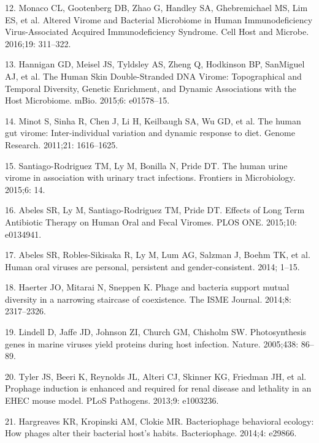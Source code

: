\documentclass[12pt,]{article}
\begin{document}
\hypertarget{ref-Monaco:2016ita}{}
12. Monaco CL, Gootenberg DB, Zhao G, Handley SA, Ghebremichael MS, Lim
ES, et al. Altered Virome and Bacterial Microbiome in Human
Immunodeficiency Virus-Associated Acquired Immunodeficiency Syndrome.
Cell Host and Microbe. 2016;19: 311--322.

\hypertarget{ref-Hannigan:2015fz}{}
13. Hannigan GD, Meisel JS, Tyldsley AS, Zheng Q, Hodkinson BP,
SanMiguel AJ, et al. The Human Skin Double-Stranded DNA Virome:
Topographical and Temporal Diversity, Genetic Enrichment, and Dynamic
Associations with the Host Microbiome. mBio. 2015;6: e01578--15.

\hypertarget{ref-Minot:2011ez}{}
14. Minot S, Sinha R, Chen J, Li H, Keilbaugh SA, Wu GD, et al. The
human gut virome: Inter-individual variation and dynamic response to
diet. Genome Research. 2011;21: 1616--1625.

\hypertarget{ref-SantiagoRodriguez:2015gd}{}
15. Santiago-Rodriguez TM, Ly M, Bonilla N, Pride DT. The human urine
virome in association with urinary tract infections. Frontiers in
Microbiology. 2015;6: 14.

\hypertarget{ref-Abeles:2015dy}{}
16. Abeles SR, Ly M, Santiago-Rodriguez TM, Pride DT. Effects of Long
Term Antibiotic Therapy on Human Oral and Fecal Viromes. PLOS ONE.
2015;10: e0134941.

\hypertarget{ref-Abeles:2014kj}{}
17. Abeles SR, Robles-Sikisaka R, Ly M, Lum AG, Salzman J, Boehm TK, et
al. Human oral viruses are personal, persistent and gender-consistent.
2014; 1--15.

\hypertarget{ref-Haerter:2014ii}{}
18. Haerter JO, Mitarai N, Sneppen K. Phage and bacteria support mutual
diversity in a narrowing staircase of coexistence. The ISME Journal.
2014;8: 2317--2326.

\hypertarget{ref-Lindell:2005gz}{}
19. Lindell D, Jaffe JD, Johnson ZI, Church GM, Chisholm SW.
Photosynthesis genes in marine viruses yield proteins during host
infection. Nature. 2005;438: 86--89.

\hypertarget{ref-Tyler:2013fl}{}
20. Tyler JS, Beeri K, Reynolds JL, Alteri CJ, Skinner KG, Friedman JH,
et al. Prophage induction is enhanced and required for renal disease and
lethality in an EHEC mouse model. PLoS Pathogens. 2013;9: e1003236.

\hypertarget{ref-Hargreaves:2014ja}{}
21. Hargreaves KR, Kropinski AM, Clokie MR. Bacteriophage behavioral
ecology: How phages alter their bacterial host's habits. Bacteriophage.
2014;4: e29866.
\end{document}
